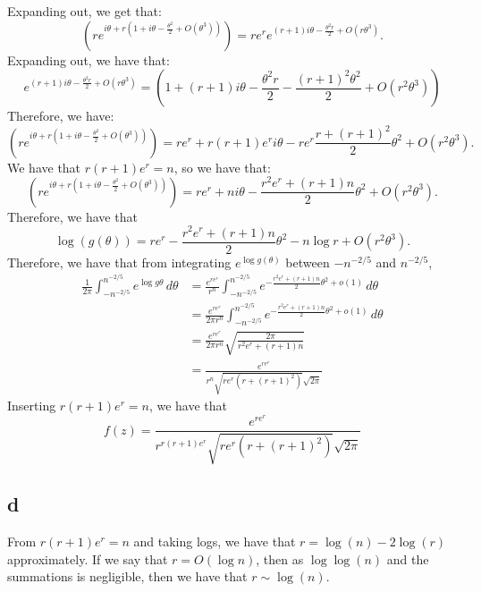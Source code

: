 \documentclass[]{article}
\theoremstyle{definition}
\numberwithin{theorem}{section}
\numberwithin{equation}{section}
\begin{document}
Expanding out, we get that:
\begin{equation}
	 (r e^{i \theta + r ( 1 + i \theta - \frac{\theta^2}{2} + O(\theta^3))}) = r e^r e^{(r + 1) i \theta- \frac{\theta^2 r}{2} + O(r\theta^3)}.
\end{equation}
Expanding out, we have that:
\begin{equation}
	e^{(r + 1) i \theta- \frac{\theta^2 r}{2} + O(r\theta^3)} = (1 + (r + 1) i \theta - \frac{\theta^2 r}{2} - \frac{(r + 1)^2 \theta^2}{2} + O(r^2 \theta^3))
\end{equation}
Therefore, we have:
\begin{equation}
	(r e^{i \theta + r ( 1 + i \theta - \frac{\theta^2}{2} + O(\theta^3))}) = r e^r + r(r + 1) e^r i \theta - r e^r \frac{r + (r + 1)^2 }{2} \theta^2 + O(r^2 \theta^3).
\end{equation}
We have that $r(r + 1) e^r = n$, so we have that:
\begin{equation}
	(r e^{i \theta + r ( 1 + i \theta - \frac{\theta^2}{2} + O(\theta^3))}) = r e^r + n i \theta - \frac{r^2 e^r + (r + 1) n}{2} \theta^2 + O(r^2 \theta^3).
\end{equation}
Therefore, we have that
\begin{equation}
	\log(g(\theta)) = r e^r - \frac{r^2 e^r + (r + 1) n }{2} \theta^2 - n \log r + O(r^2 \theta^3).
\end{equation}
Therefore, we have that from integrating $e^{\log g(\theta)}$ between $-n^{-2/5}$ and $n^{-2/5}$, 
\begin{align*}
	\frac{1}{2 \pi}\int_{-n^{-2/5}}^{n^{-2/5}} e^{\log g \theta} \, d\theta &= \frac{e^{r e^r}}{r^n} \int_{-n^{-2/5}}^{n^{-2/5}} e^{- \frac{r^2 e^r + (r + 1) n }{2} \theta^2 + o(1)} \, d\theta\\
	&=  \frac{e^{r e^r}}{ 2 \pi r^n} \int_{-n^{-2/5}}^{n^{-2/5}} e^{- \frac{r^2 e^r + (r + 1) n }{2} \theta^2 + o(1)} \, d\theta\\
	&= \frac{e^{r e^r}}{2 \pi r^n}\sqrt{\frac{2\pi}{r^2 e^r + (r + 1) n}}\\
	&= \frac{e^{r e^r}}{r^n \sqrt{r e^r(r + (r + 1)^2)} \sqrt{2\pi}}
\end{align*}
Inserting $r(r + 1) e^r = n$, we have that
\begin{equation}
	[z^n] f(z) = \frac{e^{r e^r}}{r^{r (r + 1) e^r} \sqrt{r e^r(r + (r + 1)^2)} \sqrt{2 \pi}}
\end{equation}

\subsection{d}
From $r (r + 1) e^r = n$ and taking logs, we have that $r = \log(n) - 2\log(r)$ approximately. If we say that $r = O(\log n)$, then as $\log \log (n)$ and the summations is negligible, then we have that $r \sim \log(n)$.
\end{document}
